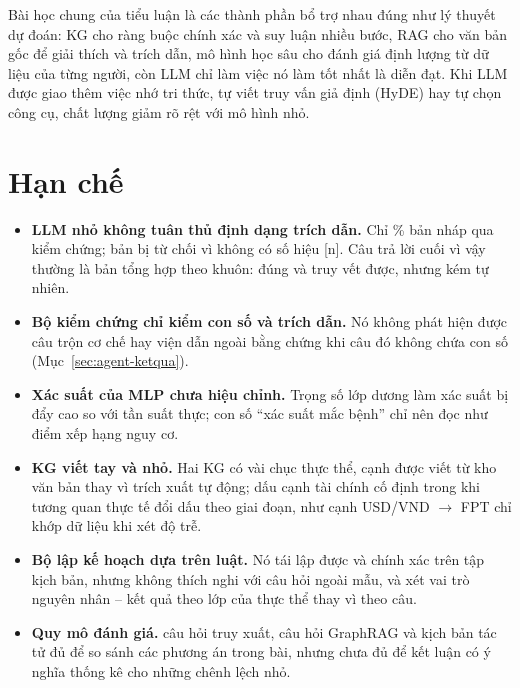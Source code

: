 Bài học chung của tiểu luận là các thành phần bổ trợ nhau đúng như lý thuyết dự đoán: KG cho ràng buộc chính xác và
suy luận nhiều bước, RAG cho văn bản gốc để giải thích và trích dẫn, mô hình học sâu cho đánh giá định lượng từ dữ
liệu của từng người, còn LLM chỉ làm việc nó làm tốt nhất là diễn đạt. Khi LLM được giao thêm việc nhớ tri thức, tự
viết truy vấn giả định (HyDE) hay tự chọn công cụ, chất lượng giảm rõ rệt với mô hình nhỏ.

\section{Hạn chế}
\begin{itemize}
  \item \textbf{LLM nhỏ không tuân thủ định dạng trích dẫn.} Chỉ \% bản nháp qua
        kiểm chứng;  bản bị từ chối vì không có số hiệu [n]. Câu trả lời cuối vì vậy thường là
        bản tổng hợp theo khuôn: đúng và truy vết được, nhưng kém tự nhiên.
  \item \textbf{Bộ kiểm chứng chỉ kiểm con số và trích dẫn.} Nó không phát hiện được câu trộn cơ chế hay viện dẫn
        ngoài bằng chứng khi câu đó không chứa con số (Mục~\ref{sec:agent-ketqua}).
  \item \textbf{Xác suất của MLP chưa hiệu chỉnh.} Trọng số lớp dương làm xác suất bị đẩy cao so với tần suất thực;
        con số ``xác suất mắc bệnh'' chỉ nên đọc như điểm xếp hạng nguy cơ.
  \item \textbf{KG viết tay và nhỏ.} Hai KG có vài chục thực thể, cạnh được viết từ kho văn bản thay vì trích xuất
        tự động; dấu cạnh tài chính cố định trong khi tương quan thực tế đổi dấu theo giai đoạn, như cạnh USD/VND $\to$
        FPT chỉ khớp dữ liệu khi xét độ trễ.
  \item \textbf{Bộ lập kế hoạch dựa trên luật.} Nó tái lập được và chính xác trên tập kịch bản, nhưng không thích
        nghi với câu hỏi ngoài mẫu, và xét vai trò nguyên nhân -- kết quả theo lớp của thực thể thay vì theo câu.
  \item \textbf{Quy mô đánh giá.}  câu hỏi truy xuất,  câu hỏi GraphRAG
        và  kịch bản tác tử đủ để so sánh các phương án trong bài, nhưng chưa đủ để kết luận có ý
        nghĩa thống kê cho những chênh lệch nhỏ.
\end{itemize}

